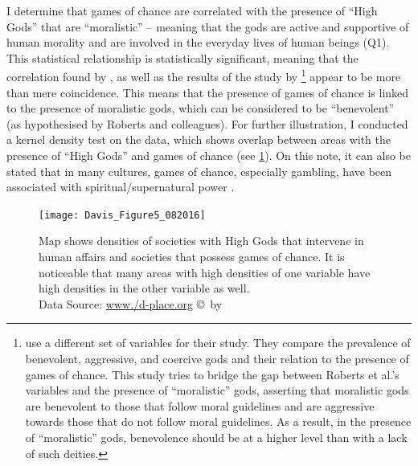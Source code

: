 \documentclass[%
	]{ijsra}
\begin{document}
I determine that games of chance are correlated with the presence of ``High Gods” that are ``moralistic” – meaning that the gods are active and supportive of human morality and are involved in the everyday lives of human beings (Q1). This statistical relationship is statistically significant, meaning that the correlation found by \textcite{ball1972}, as well as the results of the study by \textcite{roberts1959}\footnote{\textcite{roberts1959} use a different set of variables for their study. They compare the prevalence of benevolent, aggressive, and coercive gods and their relation to the presence of games of chance. This study tries to bridge the gap between Roberts et al.’s variables and the presence of ``moralistic” gods, asserting that moralistic gods are benevolent to those that follow moral guidelines and are aggressive towards those that do not follow moral guidelines. As a result, in the presence of ``moralistic” gods, benevolence should be at a higher level than with a lack of such deities.}  appear to be more than mere coincidence. This means that the presence of games of chance is linked to the presence of moralistic gods, which can be considered to be ``benevolent” (as hypothesised by Roberts and colleagues). For further illustration, I conducted a kernel density test on the data, which shows overlap between areas with the presence of ``High Gods” and games of chance (see \cref{fig:Figure5_Davis_082016}). On this note, it can also be stated that in many cultures, games of chance, especially gambling, have been associated with spiritual/supernatural power \parencites[22]{binde2005}[147]{binde2007}.

\begin{figure}[!htb] %
	\texttt{[image: Davis\_Figure5\_082016]}
	\caption{Map shows densities of societies with High Gods that intervene in human affairs and societies that possess games of chance. It is noticeable that many areas with high densities of one variable have high densities in the other variable as well.
	{\normalfont\scriptsize \\ Data Source: \href{http:/www./d-place.org}{www./d-place.org} \copyright\ by 
                 \shortauthor
                  }}
	\label{fig:Figure5_Davis_082016}
\end{figure}
\end{document}
